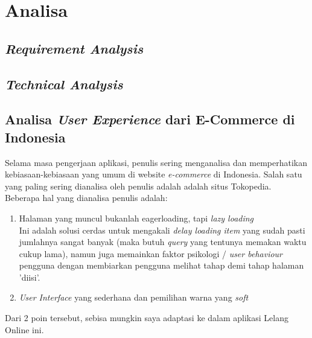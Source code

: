 \section{Analisa}

	\subsection{\textit{Requirement Analysis}}
	 
	 
	
	
	\subsection{\textit{Technical Analysis}}
	
	
	
	



\subsection{Analisa \textit{User Experience} dari E-Commerce di Indonesia}
\label{alasan-ux-ecommerce-indonesia alasan-app-serupa}
Selama masa pengerjaan aplikasi, penulis sering menganalisa dan memperhatikan kebiasaan-kebiasaan yang umum di website \textit{e-commerce} di Indonesia. Salah satu yang paling sering dianalisa oleh penulis adalah adalah situs Tokopedia.
\\
\indent Beberapa hal yang dianalisa penulis adalah:
\begin{enumerate}
	\item Halaman yang muncul bukanlah eagerloading, tapi \textit{lazy loading}\\
	\indent Ini adalah solusi cerdas untuk mengakali \textit{delay loading item} yang sudah pasti jumlahnya sangat banyak (maka butuh \textit{query} yang tentunya memakan waktu cukup lama), namun juga memainkan faktor psikologi / \textit{user behaviour} pengguna dengan membiarkan pengguna melihat tahap demi tahap halaman 'diisi'.
	\item \textit{User Interface} yang sederhana dan pemilihan warna yang \textit{soft}
\end{enumerate}
Dari 2 poin tersebut, sebisa mungkin saya adaptasi ke dalam aplikasi Lelang Online ini.


